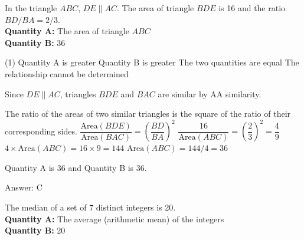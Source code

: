 \documentclass[11pt,paper=a4,answers]{exam}
\begin{document}
\begin{questions}
\question
\begin{center}
\end{center}
In the triangle $ABC$, $DE \parallel AC$. The area of triangle $BDE$ is 16 and the ratio $BD/BA = 2/3$.
\vspace{5pt}\\
\textbf{Quantity A: } The area of triangle $ABC$ \\
\vspace{5pt}
\textbf{Quantity B: } 36

\begin{tasks}(1)
\task[A)] Quantity A is greater
\task[B)] Quantity B is greater
\task[C)] The two quantities are equal
\task[D)] The relationship cannot be determined
\end{tasks}

\begin{solution}
Since $DE \parallel AC$, triangles $BDE$ and $BAC$ are similar by AA similarity.
\vspace{5pt}
\begin{center}
The ratio of the areas of two similar triangles is the square of the ratio of their corresponding sides.
\vspace{5pt}
$\dfrac{\text{Area}(BDE)}{\text{Area}(BAC)} = \left( \dfrac{BD}{BA} \right)^2$
\vspace{5pt}
$\dfrac{16}{\text{Area}(ABC)} = \left( \dfrac{2}{3} \right)^2 = \dfrac{4}{9}$
\vspace{5pt}
$4 \times \text{Area}(ABC) = 16 \times 9 = 144$
\vspace{5pt}
$\text{Area}(ABC) = 144 / 4 = 36$
\end{center}
\vspace{5pt}
Quantity A is 36 and Quantity B is 36.

Answer: \colorbox{yellow!100}{C}
\end{solution}

\vspace{1cm}

\question
The median of a set of 7 distinct integers is 20. 
\vspace{5pt}\\
\textbf{Quantity A: } The average (arithmetic mean) of the integers \\
\vspace{5pt}
\textbf{Quantity B: } 20


\end{questions}
\end{document}
